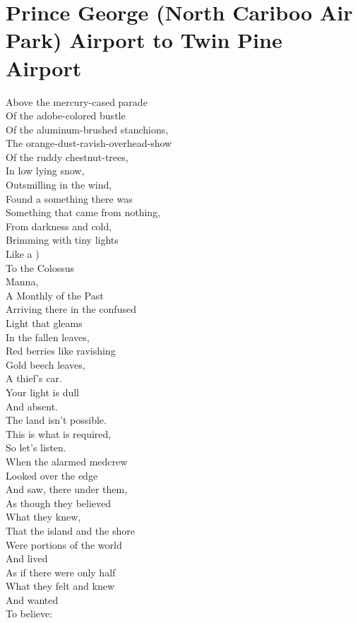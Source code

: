 \documentclass[smalldemyvopaper,11pt,twoside,onecolumn,openright,extrafontsizes]{memoir}
\begin{document}
\chapter{Prince George (North Cariboo Air Park) Airport to Twin Pine Airport}
Above the mercury-cased parade
\\Of the adobe-colored bustle
\\Of the aluminum-brushed stanchions,
\\The orange-dust-ravish-overhead-show
\\Of the ruddy chestnut-trees,
\\In low lying snow,
\\Outsmilling in the wind,
\\Found a something there was
\\Something that came from nothing,
\\From darkness and cold,
\\Brimming with tiny lights
\\Like a )
\\To the Colossus
\\Manna,
\\A Monthly of the Past
\\Arriving there in the confused
\\Light that gleams
\\In the fallen leaves,
\\Red berries like ravishing
\\Gold beech leaves,
\\A thief's car.
\\Your light is dull
\\And absent.
\\The land isn't possible.
\\This is what is required,
\\So let's listen.
\\When the alarmed medcrew
\\Looked over the edge
\\And saw, there under them,
\\As though they believed
\\What they knew,
\\That the island and the shore
\\Were portions of the world
\\And lived
\\As if there were only half
\\What they felt and knew
\\And wanted
\\To believe:
\end{document}
